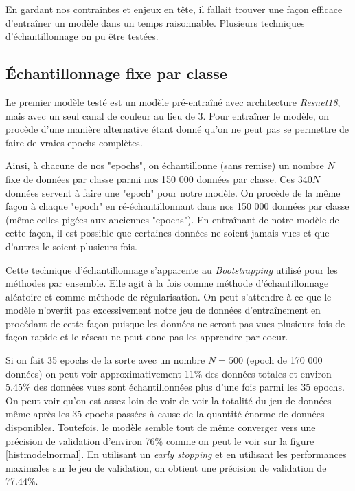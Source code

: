 En gardant nos contraintes et enjeux en tête, il fallait trouver une façon efficace d'entraîner un modèle dans un temps raisonnable. Plusieurs techniques d'échantillonnage on pu être testées.


\subsection{Échantillonnage fixe par classe}

Le premier modèle testé est un modèle pré-entraîné avec architecture \emph{Resnet18}, mais avec un seul canal de couleur au lieu de 3. Pour entraîner le modèle, on procède d'une manière alternative étant donné qu'on ne peut pas se permettre de faire de vraies epochs complètes. 



Ainsi, à chacune de nos "epochs", on échantillonne (sans remise) un nombre $N$ fixe de données par classe parmi nos 150 000 données par classe. Ces $340N$ données servent à faire une "epoch"  pour notre modèle. On procède de la même façon à chaque "epoch" en ré-échantillonnant dans nos 150 000 données par classe (même celles pigées aux anciennes "epochs"). 
En entraînant de notre modèle de cette façon, il est possible que certaines données ne soient jamais vues et que d'autres le soient plusieurs fois.


Cette technique d'échantillonnage s'apparente au \emph{Bootstrapping} utilisé pour les méthodes par ensemble. Elle agit à la fois comme méthode d'échantillonnage aléatoire et comme méthode de régularisation. 
On peut s'attendre à ce que le modèle n'overfit pas excessivement notre jeu de données d'entraînement en procédant de cette façon puisque les données ne seront pas vues plusieurs fois de façon rapide et le réseau ne peut donc pas les apprendre par coeur.


Si on fait 35 epochs de la sorte avec un nombre $N=500$ (epoch de 170 000 données) on peut voir approximativement 11\% des données totales et environ 5.45\% des données vues sont échantillonnées plus d'une fois parmi les 35 epochs. 
On peut voir qu'on est assez loin de voir de voir la totalité du jeu de données même après les 35 epochs passées à cause de la quantité énorme de données disponibles. 
Toutefois, le modèle semble tout de même converger vers une précision de validation d'environ 76\% comme on peut le voir sur la figure \ref{histmodelnormal}. 
En utilisant un \emph{early stopping} et en utilisant les performances maximales sur le jeu de validation, on obtient une précision de validation de 77.44\%.


